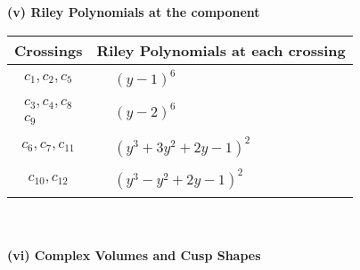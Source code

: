 \documentclass[1p]{elsarticle_modified}
\theoremstyle{definition}
\begin{document}
\newpage\renewcommand{\arraystretch}{1}
\flushleft \textbf{(v) Riley Polynomials at the component}\newline \\
\begin{tabular}{m{50pt}|m{274pt}}
Crossings & \hspace{64pt}Riley Polynomials at each crossing \\
\hline $$\begin{aligned}c_{1},c_{2},c_{5}\end{aligned}$$&$\begin{aligned}
&(y-1)^6
\end{aligned}$\\
\hline $$\begin{aligned}c_{3},c_{4},c_{8}\\c_{9}\end{aligned}$$&$\begin{aligned}
&(y-2)^6
\end{aligned}$\\
\hline $$\begin{aligned}c_{6},c_{7},c_{11}\end{aligned}$$&$\begin{aligned}
&(y^3+3 y^2+2 y-1)^2
\end{aligned}$\\
\hline $$\begin{aligned}c_{10},c_{12}\end{aligned}$$&$\begin{aligned}
&(y^3- y^2+2 y-1)^2
\end{aligned}$\\
\hline
\end{tabular}\\~\\
\newpage\flushleft \textbf{(vi) Complex Volumes and Cusp Shapes}
\end{document}
